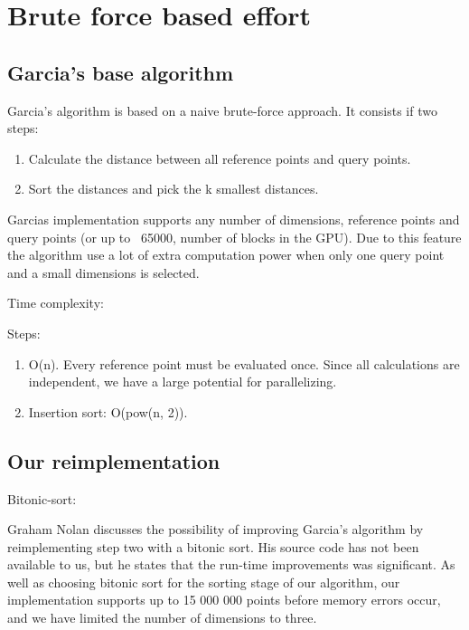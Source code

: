 \section{Brute force based effort} %
\label{sub:brute_force_based_effort}

\subsection{Garcia's base algorithm} %
\label{ssub:garcias_base_algorithme}

Garcia's algorithm is based on a naive brute-force approach. It consists if two steps:
\begin{enumerate}
    \item Calculate the distance between all reference points and query points.
    \item Sort the distances and pick the k smallest distances.
\end{enumerate}

Garcias implementation supports any number of dimensions, reference points and query points (or up to ~65000, number of blocks in the GPU). Due to this feature the algorithm use a lot of extra computation power when only one query point and a small dimensions is selected.

Time complexity:

Steps:

\begin{enumerate}
    \item O(n). Every reference point must be evaluated once. Since all calculations are independent, we have a large potential for parallelizing.
    \item Insertion sort: O(pow(n, 2)).
\end{enumerate}

\subsection{Our reimplementation} %
\label{ssub:our_reimplementation_2}

Bitonic-sort:

Graham Nolan discusses the possibility of improving Garcia's algorithm by reimplementing step two with a bitonic sort. His source code has not been available to us, but he states that the run-time improvements was significant. As well as choosing bitonic sort for the sorting stage of our algorithm, our implementation supports up to 15 000 000 points before memory errors occur, and we have limited the number of dimensions to three.

